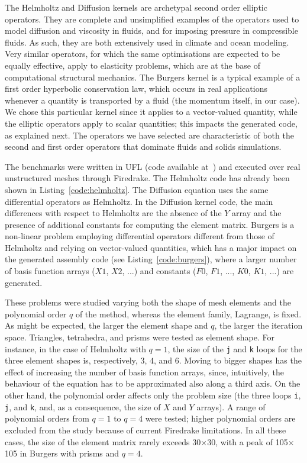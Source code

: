 The Helmholtz and Diffusion kernels are archetypal second order elliptic operators. They are complete and unsimplified examples of the operators used to model diffusion and viscosity in fluids, and for imposing pressure in compressible fluids. As such, they are both extensively used in climate and ocean modeling. Very similar operators, for which the same optimisations are expected to be equally effective, apply to elasticity problems, which are at the base of computational structural mechanics. The Burgers kernel is a typical example of a first order hyperbolic conservation law, which occurs in real applications whenever a quantity is transported by a fluid (the momentum itself, in our case). We chose this particular kernel since it applies to a vector-valued quantity, while the elliptic operators apply to scalar quantities; this impacts the generated code, as explained next. The operators we have selected are characteristic of both the second and first order operators that dominate fluids and solids simulations.

The benchmarks were written in UFL (code available at~\citep{ufl-code-individual}) and executed over real unstructured meshes through Firedrake. The Helmholtz code has already been shown in Listing~\ref{code:helmholtz}. The Diffusion equation uses the same differential operators as Helmholtz. In the Diffusion kernel code, the main differences with respect to Helmholtz are the absence of the $Y$ array and the presence of additional constants for computing the element matrix. Burgers is a non-linear problem employing differential operators different from those of Helmholtz and relying on vector-valued quantities, which has a major impact on the generated assembly code (see Listing~\ref{code:burgers}), where a larger number of basis function arrays ($X1$, $X2$, ...) and constants ($F0$, $F1$, ..., $K0$, $K1$,
...) are generated. 

These problems were studied varying both the shape of mesh elements and the polynomial order $q$ of the method, whereas the element family, Lagrange, is fixed. As might be expected, the larger the element shape and $q$, the larger the iteration space. Triangles, tetrahedra, and prisms were tested as element shape. For instance, in the case of Helmholtz with $q=1$, the size of the \texttt{j} and \texttt{k} loops for the three element shapes is, respectively, $3$, $4$, and $6$. Moving to bigger shapes has the effect of increasing the number of basis function arrays, since, intuitively, the behaviour of the equation has to be approximated also along a third axis. On the other hand, the polynomial order affects only the problem size (the three loops \texttt{i}, \texttt{j}, and \texttt{k}, and, as a consequence, the size of $X$ and $Y$ arrays). A range of polynomial orders from $q=1$ to $q=4$ were tested; higher polynomial orders are excluded from the study because of current Firedrake limitations. In all these cases, the size of the element matrix rarely exceeds 30$\times$30, with a peak of 105$\times$105 in Burgers with prisms and $q=4$.

